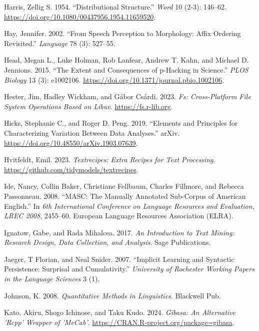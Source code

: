 \documentclass[
  letterpaper,
]{latex/krantz}
\newlength{\cslhangindent}
\newenvironment{CSLReferences}[2] %
 {\begin{list}{}{%
  \setlength{\itemindent}{0pt}
  \setlength{\leftmargin}{0pt}
  \setlength{\parsep}{0pt}
  \ifodd #1
   \setlength{\leftmargin}{\cslhangindent}
   \setlength{\itemindent}{-1\cslhangindent}
  \fi
  \setlength{\itemsep}{#2\baselineskip}}}
 {\end{list}}
\theoremstyle{definition}
\theoremstyle{remark}
\begin{document}
\begin{CSLReferences}{1}{0}
Harris, Zellig S. 1954. {``Distributional Structure.''} \emph{Word} 10
(2-3): 146--62. \url{https://doi.org/10.1080/00437956.1954.11659520}.

Hay, Jennifer. 2002. {``From Speech Perception to Morphology: Affix
Ordering Revisited.''} \emph{Language} 78 (3): 527--55.

Head, Megan L., Luke Holman, Rob Lanfear, Andrew T. Kahn, and Michael D.
Jennions. 2015. {``The Extent and Consequences of p-Hacking in
Science.''} \emph{PLOS Biology} 13 (3): e1002106.
\url{https://doi.org/10.1371/journal.pbio.1002106}.

Hester, Jim, Hadley Wickham, and Gábor Csárdi. 2023. \emph{Fs:
Cross-Platform File System Operations Based on Libuv}.
\url{https://fs.r-lib.org}.

Hicks, Stephanie C., and Roger D. Peng. 2019. {``Elements and Principles
for Characterizing Variation Between Data Analyses.''} arXiv.
\url{https://doi.org/10.48550/arXiv.1903.07639}.

Hvitfeldt, Emil. 2023. \emph{Textrecipes: Extra Recipes for Text
Processing}. \url{https://github.com/tidymodels/textrecipes}.

Ide, Nancy, Collin Baker, Christiane Fellbaum, Charles Fillmore, and
Rebecca Passonneau. 2008. {``MASC: The Manually Annotated Sub-Corpus of
American English.''} In \emph{6th International Conference on Language
Resources and Evaluation, LREC 2008}, 2455--60. European Language
Resources Association (ELRA).

Ignatow, Gabe, and Rada Mihalcea. 2017. \emph{An Introduction to Text
Mining: Research Design, Data Collection, and Analysis}. Sage
Publications.

Jaeger, T Florian, and Neal Snider. 2007. {``Implicit Learning and
Syntactic Persistence: Surprisal and Cumulativity.''} \emph{University
of Rochester Working Papers in the Language Sciences} 3 (1).

Johnson, K. 2008. \emph{Quantitative Methods in Linguistics}. Blackwell
Pub.

Kato, Akiru, Shogo Ichinose, and Taku Kudo. 2024. \emph{Gibasa: An
Alternative 'Rcpp' Wrapper of 'MeCab'}.
\url{https://CRAN.R-project.org/package=gibasa}.


\end{CSLReferences}
\end{document}
